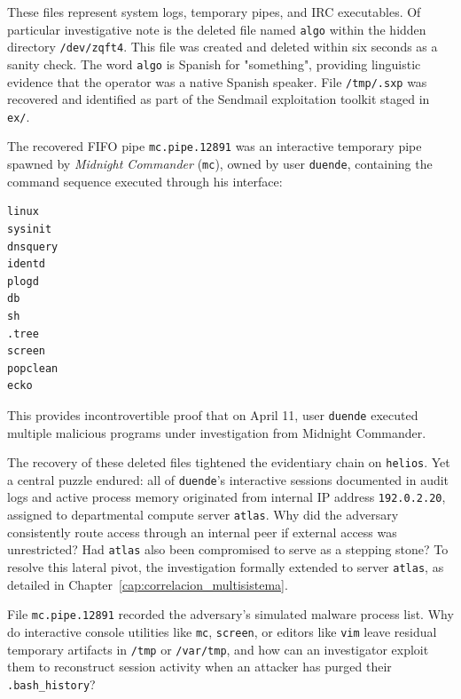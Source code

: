 These files represent system logs, temporary pipes, and IRC executables. Of particular investigative note is the deleted file named \texttt{algo} within the hidden directory \texttt{/dev/zqft4}. This file was created and deleted within six seconds as a sanity check. The word \texttt{algo} is Spanish for "something", providing linguistic evidence that the operator was a native Spanish speaker. File \texttt{/tmp/.sxp} was recovered and identified as part of the Sendmail exploitation toolkit staged in \texttt{ex/}.

The recovered FIFO pipe \texttt{mc.pipe.12891} was an interactive temporary pipe spawned by \textit{Midnight Commander} (\texttt{mc}), owned by user \texttt{duende}, containing the command sequence executed through his interface:

\vspace{1em}

{\footnotesize
\begin{lstlisting}[style=terminal]
linux
sysinit
dnsquery
identd
plogd
db
sh
.tree
screen
popclean
ecko
\end{lstlisting}
}

\vspace{1em}

This provides incontrovertible proof that on April 11, user \texttt{duende} executed multiple malicious programs under investigation from Midnight Commander.

The recovery of these deleted files tightened the evidentiary chain on \texttt{helios}. Yet a central puzzle endured: all of \texttt{duende}'s interactive sessions documented in audit logs and active process memory originated from internal IP address \texttt{192.0.2.20}, assigned to departmental compute server \texttt{atlas}. Why did the adversary consistently route access through an internal peer if external access was unrestricted? Had \texttt{atlas} also been compromised to serve as a stepping stone? To resolve this lateral pivot, the investigation formally extended to server \texttt{atlas}, as detailed in Chapter~\ref{cap:correlacion_multisistema}.

\begin{retoforense}
File \texttt{mc.pipe.12891} recorded the adversary's simulated malware process list. Why do interactive console utilities like \texttt{mc}, \texttt{screen}, or editors like \texttt{vim} leave residual temporary artifacts in \texttt{/tmp} or \texttt{/var/tmp}, and how can an investigator exploit them to reconstruct session activity when an attacker has purged their \texttt{.bash\_history}?
\end{retoforense}

